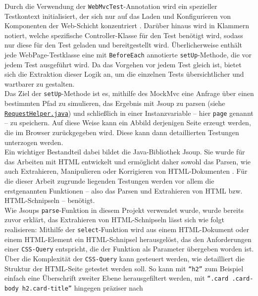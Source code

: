 Durch die Verwendung der \texttt{WebMvcTest}-Annotation wird ein spezieller 
Testkontext initialisiert, der sich nur auf das Laden und Konfigurieren von 
Komponenten der Web-Schicht konzentriert \cite{vmware2024webmvctest}. 
Darüber hinaus wird in Klammern notiert, welche spezifische Controller-Klasse für 
den Test benötigt wird, sodass nur diese für den Test geladen und bereitgestellt 
wird. Überlicherweise enthält jede WebPage-Testklasse eine mit \texttt{BeforeEach} 
annotierte \texttt{setUp}-Methode, die vor jedem Test ausgeführt wird. Da das 
Vorgehen vor jedem Test gleich ist, bietet sich die Extraktion dieser Logik an, 
um die einzelnen Tests übersichtlicher und wartbarer zu gestalten. \\ 
Das Ziel der \texttt{setUp}-Methode ist es, mithilfe des MockMvc eine Anfrage über 
einen bestimmten Pfad zu simulieren, das Ergebnis mit Jsoup zu parsen (siehe 
\href{https://github.com/FlorianOhmes/bat_spielzeitenplaner/blob/main/spielzeitenplaner/src/test/java/de/bathesis/spielzeitenplaner/utilities/RequestHelper.java}{\texttt{RequestHelper.java}}) und schließlich in einer 
Instanzvariable -- hier \texttt{page} genannt -- zu speichern. Auf diese Weise kann 
ein Abbild derjenigen Seite erzeugt werden, die im Browser zurückgegeben wird. 
Diese kann dann detaillierten Testungen unterzogen werden. \\ 
Ein wichtiger Bestandteil dabei bildet die Java-Bibliothek Jsoup. Sie wurde für das 
Arbeiten mit HTML entwickelt und ermöglicht daher sowohl das Parsen, wie auch 
Extrahieren, Manipulieren oder Korrigieren von HTML-Dokumenten 
\cite{hedley2024jsoup}. Für die dieser Arbeit zugrunde liegenden 
Testungen werden vor allem die erstgenannten Funktionen -- also das Parsen und 
Extrahieren von HTML bzw. HTML-Schnipseln -- benötigt. \\ 
Wie Jsoups \texttt{parse}-Funktion in diesem Projekt verwendet wurde, wurde bereits 
zuvor erklärt, das Extrahieren von HTML-Schnipseln lässt sich wie folgt 
realisieren: Mithilfe der \texttt{select}-Funktion wird aus einem HTML-Dokument 
oder einem HTML-Element ein HTML-Schnipsel herausgelöst, das den Anforderungen 
einer \texttt{CSS-Query} entspricht, die der Funktion als Parameter übergeben 
worden ist. \\ 
Über die Komplexität der \texttt{CSS-Query} kann gesteuert werden, wie 
detailliert die Struktur der HTML-Seite getestet werden soll. So kann mit 
\texttt{``h2''} zum Beispiel einfach eine Überschrift zweiter Ebene herausgefiltert 
werden, mit \texttt{``.card .card-body h2.card-title''} hingegen präziser nach 
